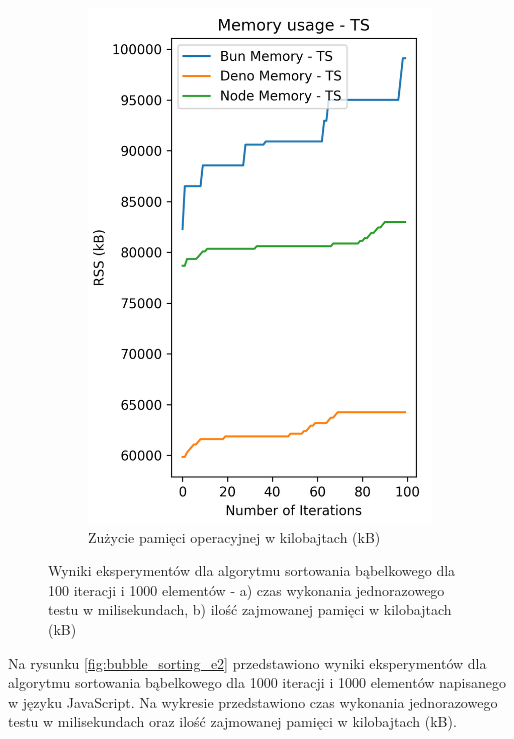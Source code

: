 \begin{figure}[H]
\begin{subfigure}[b]{0.4\textwidth}
  \end{subfigure}
  \begin{subfigure}[b]{0.4\textwidth}
    \centering
    \includegraphics[width=\textwidth]{Figures/sorting/sorting_bubble_100_1000_ts_memory.png}
    \caption{Zużycie pamięci operacyjnej w kilobajtach (kB)}
    \label{fig:bubble_sorting_e1_ts_memory}
  \end{subfigure}
  \caption{Wyniki eksperymentów dla algorytmu sortowania bąbelkowego dla 100 iteracji i 1000 elementów - a) czas wykonania jednorazowego testu w milisekundach, b) ilość zajmowanej pamięci w kilobajtach (kB)}
  \label{fig:bubble_sorting_e1_ts}
\end{figure}

Na rysunku \ref{fig:bubble_sorting_e2} przedstawiono wyniki eksperymentów dla algorytmu sortowania bąbelkowego dla 1000 iteracji i 1000 elementów napisanego w języku JavaScript. Na wykresie przedstawiono czas wykonania jednorazowego testu w milisekundach oraz ilość zajmowanej pamięci w kilobajtach (kB).

